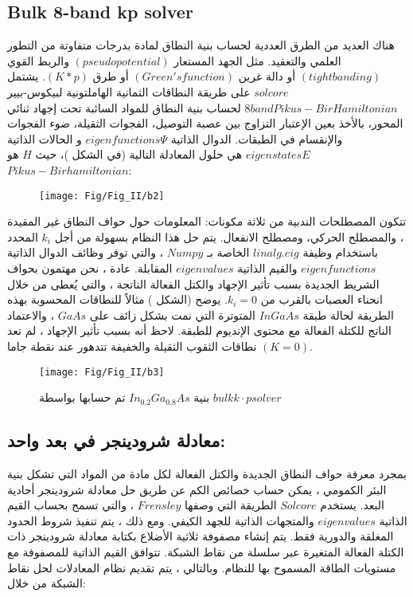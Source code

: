 \subsection{Bulk 8-band kp solver}
هناك العديد من الطرق العددية لحساب بنية النطاق لمادة بدرجات متفاوتة من التطور العلمي  والتعقيد. مثل الجهد المستعار $ (pseudopotential) $  والربط القوي $ (tight banding ) $ أو دالة غرين $ (Green's function) $ أو طرق $ (K*p) $. يشتمل $ solcore  $ على طريقة النطاقات الثمانية الهاملتونية لبيكوس-بيير $ 8band Pikus-Bir Hamiltonian $ لحساب بنية النطاق للمواد السائبة تحت إجهاد ثنائي المحور، بالأخذ بعين الإعتبار التزاوج بين عصبة التوصيل، الفجوات الثقيلة، ضوء الفجوات والإنقسام في الطبقات.
الدوال الذاتية $ eigenfunctions Ψ $ و الحالات الذاتية $ eigenstates E$ هي حلول المعادلة التالية (في الشكل )، حيث $ H $ هو $ Pikus-Bir hamiltonian $:
\begin{figure}[h!]
	\centering
	\texttt{[image: Fig/Fig\_II/b2]}
	\caption{}
	\label{fig:b2}
\end{figure}
\FloatBarrier


تتكون المصطلحات الندبية من ثلاثة مكونات: المعلومات حول حواف النطاق غير المقيدة ، والمصطلح الحركي، ومصطلح الانفعال.
يتم حل هذا النظام بسهولة من أجل $ k_i $ المحدد باستخدام وظيفة $ linalg.eig $ الخاصة بـ $ Numpy $ ، والتي توفر وظائف الدوال الذاتية $ eigenfunctions $ والقيم الذاتية $ eigenvalues $ المقابلة. عادة ، نحن مهتمون بحواف الشريط الجديدة بسبب تأثير الإجهاد والكتل الفعالة الناتجة ، والتي يُعطى من خلال انحناء العصبات بالقرب من $ k_i = 0 $. يوضح (الشكل ) مثالاً للنطاقات المحسوبة بهذه الطريقة لحالة طبقة $ InGaAs $ المتوترة التي نمت بشكل زائف على $ GaAs $ ، والاعتماد الناتج للكتلة الفعالة مع محتوى الإنديوم للطبقة. لاحظ أنه بسبب تأثير الإجهاد ، لم تعد نطاقات الثقوب الثقيلة والخفيفة تتدهور عند نقطة جاما $ (K = 0) $.
\begin{figure}[h!]
	\centering
	\texttt{[image: Fig/Fig\_II/b3]}
	\caption{بنية $  In_{0.2}Ga_{0.8}As $ تم حسابها بواسطة $ bulk k· p solver $}
	\label{fig:b3}
\end{figure}
\FloatBarrier

\subsection{معادلة شرودينجر في بعد واحد:}
بمجرد معرفة حواف النطاق الجديدة والكتل الفعالة لكل مادة من المواد التي تشكل بنية البئر الكمومي ، يمكن حساب خصائص الكم عن طريق حل معادلة شرودينجر أحادية البعد. يستخدم $ Solcore $ الطريقة التي وصفها $ Frensley $ ، والتي تسمح بحساب القيم الذاتية $ eigenvalues $ والمتجهات الذاتية للجهد الكيفي. ومع ذلك ، يتم تنفيذ شروط الحدود المغلقة والدورية فقط.
يتم إنشاء مصفوفة ثلاثية الأضلاع بكتابة معادلة شرودينجر ذات الكتلة الفعالة المتغيرة عبر سلسلة من نقاط الشبكة. تتوافق القيم الذاتية للمصفوفة مع مستويات الطاقة المسموح بها للنظام. وبالتالي ، يتم تقديم نظام المعادلات لحل نقاط الشبكة من خلال:

